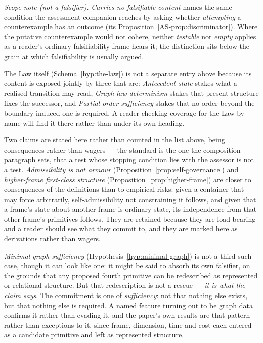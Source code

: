 \documentclass[11pt,a4paper]{article}
\theoremstyle{remark}\newtheorem{remark}[definition]{Remark}
\begin{document}
\noindent\emph{Scope note (not a falsifier).} \emph{Carries no falsifiable content} names the same condition the assessment companion reaches by asking whether \emph{attempting} a counterexample has an outcome (its Proposition~\ref{AS-prop:discriminator}). Where the putative counterexample would not cohere, neither \emph{testable} nor \emph{empty} applies as a reader's ordinary falsifiability frame hears it; the distinction sits below the grain at which falsifiability is usually argued.

The Law itself (Schema~\ref{hyp:the-law}) is not a separate entry above because its content is exposed jointly by three that are: \emph{Antecedent-state} stakes what a realised transition may read, \emph{Graph-law determinism} stakes that present structure fixes the successor, and \emph{Partial-order sufficiency} stakes that no order beyond the boundary-induced one is required. A reader checking coverage for the Law by name will find it there rather than under its own heading.

Two claims are stated here rather than counted in the list above, being consequences rather than wagers --- the standard is the one the composition paragraph sets, that a test whose stopping condition lies with the assessor is not a test. \emph{Admissibility is not armour} (Proposition~\ref{prop:self-governance}) and \emph{higher-frame first-class structure} (Proposition~\ref{prop:higher-frame}) are closer to consequences of the definitions than to empirical risks: given a container that may force arbitrarily, self-admissibility not constraining it follows, and given that a frame's state about another frame is ordinary state, its independence from that other frame's primitives follows. They are retained because they are load-bearing and a reader should see what they commit to, and they are marked here as derivations rather than wagers.

\emph{Minimal graph sufficiency} (Hypothesis~\ref{hyp:minimal-graph}) is not a third such case, though it can look like one: it might be said to absorb its own falsifier, on the grounds that any proposed fourth primitive can be redescribed as represented or relational structure. But that redescription is not a rescue --- \emph{it is what the claim says}. The commitment is one of \emph{sufficiency}: not that nothing else exists, but that nothing else is required. A named feature turning out to be graph data confirms it rather than evading it, and the paper's own results are that pattern rather than exceptions to it, since frame, dimension, time and cost each entered as a candidate primitive and left as represented structure.
\end{document}
